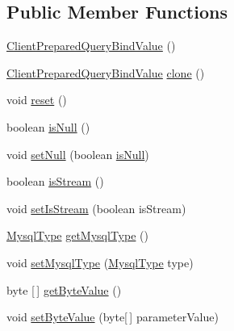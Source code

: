 \subsection*{Public Member Functions}
\begin{DoxyCompactItemize}
\item 
\mbox{\hyperlink{classcom_1_1mysql_1_1cj_1_1_client_prepared_query_bind_value_a1899881fc95dbd1b0335d20fee402ce1}{Client\+Prepared\+Query\+Bind\+Value}} ()
\item 
\mbox{\hyperlink{classcom_1_1mysql_1_1cj_1_1_client_prepared_query_bind_value}{Client\+Prepared\+Query\+Bind\+Value}} \mbox{\hyperlink{classcom_1_1mysql_1_1cj_1_1_client_prepared_query_bind_value_a4ff631107a4d41eee8c901b7085c281f}{clone}} ()
\item 
void \mbox{\hyperlink{classcom_1_1mysql_1_1cj_1_1_client_prepared_query_bind_value_aac106a5094f15af61d1921bf89af5668}{reset}} ()
\item 
boolean \mbox{\hyperlink{classcom_1_1mysql_1_1cj_1_1_client_prepared_query_bind_value_ae4e7ad98b2e3a345ed4313d999e4d3a5}{is\+Null}} ()
\item 
void \mbox{\hyperlink{classcom_1_1mysql_1_1cj_1_1_client_prepared_query_bind_value_a72bd20bab00cb3b893e7f76fb64b74fd}{set\+Null}} (boolean \mbox{\hyperlink{classcom_1_1mysql_1_1cj_1_1_client_prepared_query_bind_value_a5f070c408a6a65deaf0c2581f34cdfe9}{is\+Null}})
\item 
boolean \mbox{\hyperlink{classcom_1_1mysql_1_1cj_1_1_client_prepared_query_bind_value_a624753143b95fbec245f37b73d41710f}{is\+Stream}} ()
\item 
void \mbox{\hyperlink{classcom_1_1mysql_1_1cj_1_1_client_prepared_query_bind_value_a742ae1604e7c6a06c1bed94d5dab936a}{set\+Is\+Stream}} (boolean is\+Stream)
\item 
\mbox{\hyperlink{enumcom_1_1mysql_1_1cj_1_1_mysql_type}{Mysql\+Type}} \mbox{\hyperlink{classcom_1_1mysql_1_1cj_1_1_client_prepared_query_bind_value_a7594a864e3e8a44dde56babfc7958d75}{get\+Mysql\+Type}} ()
\item 
void \mbox{\hyperlink{classcom_1_1mysql_1_1cj_1_1_client_prepared_query_bind_value_a454d8f5fab8fd48d421a4678ad4aff40}{set\+Mysql\+Type}} (\mbox{\hyperlink{enumcom_1_1mysql_1_1cj_1_1_mysql_type}{Mysql\+Type}} type)
\item 
byte \mbox{[}$\,$\mbox{]} \mbox{\hyperlink{classcom_1_1mysql_1_1cj_1_1_client_prepared_query_bind_value_a4bd862b93770f5f4eca133257026a10c}{get\+Byte\+Value}} ()
\item 
void \mbox{\hyperlink{classcom_1_1mysql_1_1cj_1_1_client_prepared_query_bind_value_a2881b8e00374727ad118362e9c76b383}{set\+Byte\+Value}} (byte\mbox{[}$\,$\mbox{]} parameter\+Value)

\end{DoxyCompactItemize}
